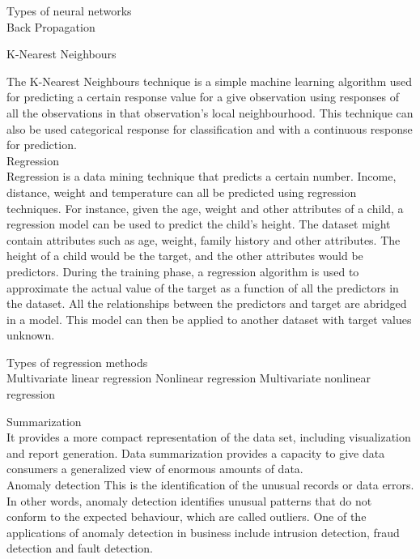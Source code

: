 \documentclass[conference]{IEEEtran}
\begin{document}
Types of neural networks \\

Back Propagation

K-Nearest Neighbours

The K-Nearest Neighbours technique is a simple machine learning algorithm used for predicting a certain response value for a give observation using responses of all the observations in that observation’s local neighbourhood. This technique can also be used categorical response for classification and with a continuous response for prediction.\\

Regression\\

Regression is a data mining technique that predicts a certain number. Income, distance, weight and temperature can all be predicted using regression techniques. For instance, given the age, weight and other attributes of a child, a regression model can be used to predict the child’s height. The dataset might contain attributes such as age, weight, family history and other attributes. The height of a child would be the target, and the other attributes would be predictors.
During the training phase, a regression algorithm is used to approximate the actual value of the target as a function of all the predictors in the dataset. All the relationships between the predictors and target are abridged in a model. This model can then be applied to another dataset with target values unknown.

 Types of regression methods\\
 
Multivariate linear regression
Nonlinear regression
Multivariate nonlinear regression

Summarization \\
It provides a more compact representation of the data set, including visualization and report generation. Data summarization provides a capacity to give data consumers a generalized view of enormous amounts of data. \\
Anomaly detection
This is the identification of the unusual records or data errors. In other words, anomaly detection identifies unusual patterns that do not conform to the expected behaviour, which are called outliers. One of the applications of anomaly detection in business include intrusion detection, fraud detection and fault detection.\\ \\
\end{document}
